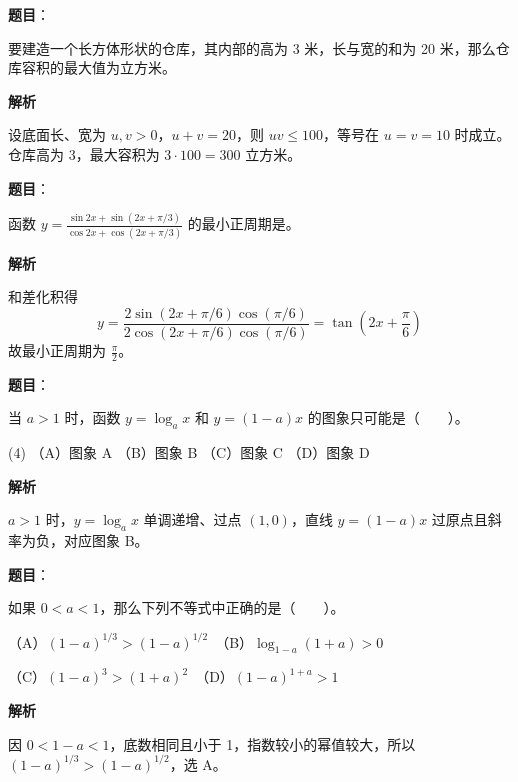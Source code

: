 \begin{answer}

\textbf{题目}：

要建造一个长方体形状的仓库，其内部的高为 3 米，长与宽的和为 20 米，那么仓库容积的最大值为\gkblank{}立方米。

\textbf{解析}

设底面长、宽为 \(u,v>0\)，\(u+v=20\)，则 \(uv\le100\)，等号在 \(u=v=10\) 时成立。仓库高为 3，最大容积为 \(3\cdot100=300\) 立方米。


\end{answer}
\begin{answer}

\textbf{题目}：

函数 \(\displaystyle y=\frac{\sin 2x+\sin(2x+\pi/3)}{\cos 2x+\cos(2x+\pi/3)}\) 的最小正周期是\gkblank{}。

\textbf{解析}

和差化积得
\nopagebreak[4]
\[
y=\frac{2\sin(2x+\pi/6)\cos(\pi/6)}{2\cos(2x+\pi/6)\cos(\pi/6)}=\tan\left(2x+\frac\pi6\right)
\]
故最小正周期为 \(\frac\pi2\)。


\end{answer}
\begin{answer}

\textbf{题目}：

当 \(a>1\) 时，函数 \(y=\log_a x\) 和 \(y=(1-a)x\) 的图象只可能是\mbox{（　　）}。

\begin{gkopts}(4)
\task （A）图象 A
\task （B）图象 B
\task （C）图象 C
\task （D）图象 D
\end{gkopts}
\nopagebreak[4]
\begin{center}\end{center}
\nopagebreak[4]
\textbf{解析}

\(a>1\) 时，\(y=\log_a x\) 单调递增、过点 \((1,0)\)，直线 \(y=(1-a)x\) 过原点且斜率为负，对应图象 B。


\end{answer}
\begin{answer}

\textbf{题目}：

如果 \(0<a<1\)，那么下列不等式中正确的是\mbox{（　　）}。

（A）\((1-a)^{1/3}>(1-a)^{1/2}\)　（B）\(\log_{1-a}(1+a)>0\)

（C）\((1-a)^3>(1+a)^2\)　（D）\((1-a)^{1+a}>1\)

\textbf{解析}

因 \(0<1-a<1\)，底数相同且小于 1，指数较小的幂值较大，所以 \((1-a)^{1/3}>(1-a)^{1/2}\)，选 A。


\end{answer}
